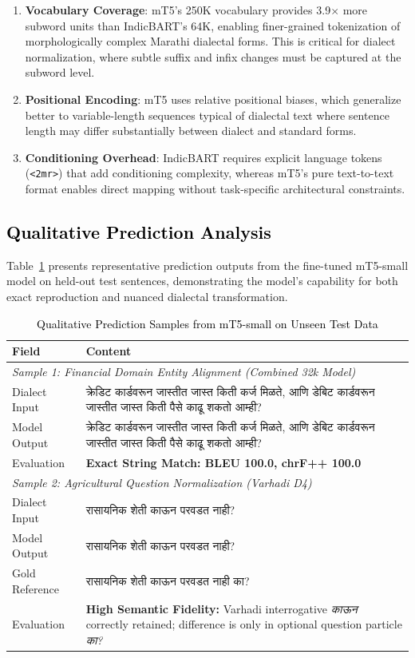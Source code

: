 \begin{enumerate}
    \item \textbf{Vocabulary Coverage}: mT5's 250K vocabulary provides 3.9$\times$ more subword units than IndicBART's 64K, enabling finer-grained tokenization of morphologically complex Marathi dialectal forms. This is critical for dialect normalization, where subtle suffix and infix changes must be captured at the subword level.
    \item \textbf{Positional Encoding}: mT5 uses relative positional biases, which generalize better to variable-length sequences typical of dialectal text where sentence length may differ substantially between dialect and standard forms.
    \item \textbf{Conditioning Overhead}: IndicBART requires explicit language tokens (\texttt{<2mr>}) that add conditioning complexity, whereas mT5's pure text-to-text format enables direct mapping without task-specific architectural constraints.
\end{enumerate}

\subsection{\textcolor{black}{Qualitative Prediction Analysis}}

Table~\ref{tab:qualitative} presents representative prediction outputs from the fine-tuned mT5-small model on held-out test sentences, demonstrating the model's capability for both exact reproduction and nuanced dialectal transformation.

\begin{table}[t]
\color{black}
\centering
\caption{\textcolor{black}{Qualitative Prediction Samples from mT5-small on Unseen Test Data}}
\label{tab:qualitative}
\begin{tabularx}{\textwidth}{lX}
\hline
\textbf{Field} & \textbf{Content} \\
\hline
\multicolumn{2}{l}{\textit{Sample 1: Financial Domain Entity Alignment (Combined 32k Model)}} \\
\hline
Dialect Input & क्रेडिट कार्डवरून जास्तीत जास्त किती कर्ज मिळते, आणि डेबिट कार्डवरून जास्तीत जास्त किती पैसे काढू शकतो आम्ही? \\
Model Output & क्रेडिट कार्डवरून जास्तीत जास्त किती कर्ज मिळते, आणि डेबिट कार्डवरून जास्तीत जास्त किती पैसे काढू शकतो आम्ही? \\
Evaluation & \textbf{Exact String Match: BLEU 100.0, chrF++ 100.0} \\
\hline
\multicolumn{2}{l}{\textit{Sample 2: Agricultural Question Normalization (Varhadi D4)}} \\
\hline
Dialect Input & रासायनिक शेती काऊन परवडत नाही? \\
Model Output & रासायनिक शेती काऊन परवडत नाही? \\
Gold Reference & रासायनिक शेती काऊन परवडत नाही का? \\
Evaluation & \textbf{High Semantic Fidelity:} Varhadi interrogative \emph{काऊन} correctly retained; difference is only in optional question particle \emph{का?} \\
\hline
\end{tabularx}
\end{table}

